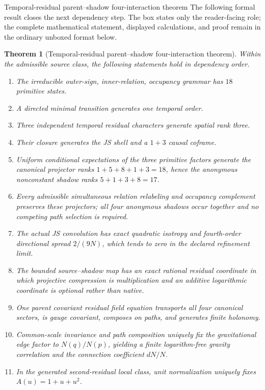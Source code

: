 \documentclass[11pt]{article}
\numberwithin{equation}{section}
\newtheorem{theorem}[definition]{Theorem}
\theoremstyle{remark}
\begin{document}
\begin{proofguide}{Temporal-residual parent--shadow four-interaction theorem}
The following formal result closes the next dependency step. The box states only the reader-facing role; the complete mathematical statement, displayed calculations, and proof remain in the ordinary unboxed format below.
\end{proofguide}
\begin{theorem}[Temporal-residual parent--shadow four-interaction theorem]
Within the admissible source class, the following statements hold in dependency order.
\begin{enumerate}
\item The irreducible outer-sign, inner-relation, occupancy grammar has $18$ primitive states.
\item A directed minimal transition generates one temporal order.
\item Three independent temporal residual characters generate spatial rank three.
\item Their closure generates the JS shell and a $1+3$ causal coframe.
\item Uniform conditional expectations of the three primitive factors generate the canonical projector ranks $1+5+8+1+3=18$, hence the anonymous nonconstant shadow ranks $5+1+3+8=17$.
\item Every admissible simultaneous relation relabeling and occupancy complement preserves these projectors; all four anonymous shadows occur together and no competing path selection is required.
\item The actual JS convolution has exact quadratic isotropy and fourth-order directional spread $2/(9N)$, which tends to zero in the declared refinement limit.
\item The bounded source--shadow map has an exact rational residual coordinate in which projective compression is multiplication and an additive logarithmic coordinate is optional rather than native.
\item One parent covariant residual field equation transports all four canonical sectors, is gauge covariant, composes on paths, and generates finite holonomy.
\item Common-scale invariance and path composition uniquely fix the gravitational edge factor to $N(q)/N(p)$, yielding a finite logarithm-free gravity correlation and the connection coefficient $dN/N$.
\item In the generated second-residual local class, unit normalization uniquely fixes $A(u)=1+u+u^2$.

\end{enumerate}
\end{theorem}
\end{document}
